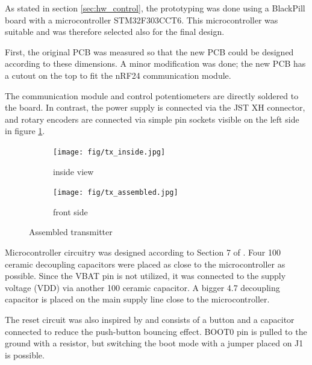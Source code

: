 As stated in section \ref{sec:hw_control}, the prototyping was done using a BlackPill board with a microcontroller STM32F303CCT6. This microcontroller was suitable and was therefore selected also for the final design.

First, the original PCB was measured so that the new PCB could be designed according to these dimensions. A minor modification was done; the new PCB has a cutout on the top to fit the nRF24 communication module.

The communication module and control potentiometers are directly soldered to the board. In contrast, the power supply is connected via the JST XH connector, and rotary encoders are connected via simple pin sockets visible on the left side in figure \ref{fig:tx_assembly_a}.
\begin{figure}[h]
    \centering
    \begin{subfigure}{0.4\textwidth}
    \centering
        \texttt{[image: fig/tx\_inside.jpg]}
		\caption{inside view}
		\label{fig:tx_assembly_a}
    \end{subfigure}%
    \hspace{1cm}
    \begin{subfigure}{0.4\textwidth}
    \centering
		\texttt{[image: fig/tx\_assembled.jpg]}
		\caption{front side}
    \end{subfigure}
	\caption{Assembled transmitter}
    \label{fig:tx_assembly}
    \end{figure}

Microcontroller circuitry was designed according to Section 7 of \cite{f3_design_an}. Four \SI{100}{\nF} ceramic decoupling capacitors were placed as close to the microcontroller as possible. Since the VBAT pin is not utilized, it was connected to the supply voltage (VDD) via another \SI{100}{\nF} ceramic capacitor. A bigger \SI{4.7}{\uF} decoupling capacitor is placed on the main supply line close to the microcontroller.

The reset circuit was also inspired by \cite{f3_design_an} and consists of a button and a capacitor connected to reduce the push-button bouncing effect. BOOT0 pin is pulled to the ground with a resistor, but switching the boot mode with a jumper placed on J1 is possible.

